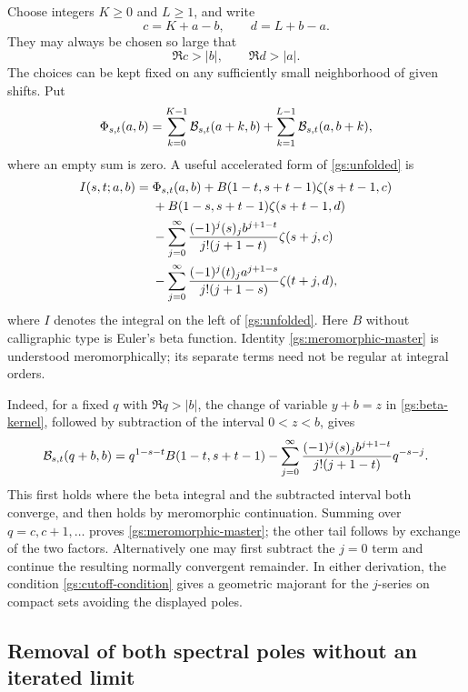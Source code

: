 \documentclass[11pt,letterpaper]{article}
\numberwithin{equation}{section}
\theoremstyle{definition}
\theoremstyle{remark}
\begin{document}
Choose integers $K\ge0$ and $L\ge1$, and write
\begin{equation}\label{gs:cd}
 c=K+a-b,\qquad d=L+b-a.
\end{equation}
They may always be chosen so large that
\begin{equation}\label{gs:cutoff-condition}
 \Re c>|b|,\qquad \Re d>|a|.
\end{equation}
The choices can be kept fixed on any sufficiently small neighborhood
of given shifts.  Put
\begin{equation}\label{gs:finite-prefix}
 \Phi_{s,t}(a,b)=
 \sum_{k=0}^{K-1}\mathcal B_{s,t}(a+k,b)
 +\sum_{k=1}^{L-1}\mathcal B_{s,t}(a,b+k),
\end{equation}
where an empty sum is zero.  A useful accelerated form of
\eqref{gs:unfolded} is
\begin{align}
 I(s,t;a,b)={}&\Phi_{s,t}(a,b)
 +B(1-t,s+t-1)\zeta(s+t-1,c)\notag\\
 &+B(1-s,s+t-1)\zeta(s+t-1,d)\notag\\
 &-\sum_{j=0}^\infty
 \frac{(-1)^j(s)_j b^{j+1-t}}{j!(j+1-t)}\zeta(s+j,c)\notag\\
 &-\sum_{j=0}^\infty
 \frac{(-1)^j(t)_j a^{j+1-s}}{j!(j+1-s)}\zeta(t+j,d),
 \label{gs:meromorphic-master}
\end{align}
where $I$ denotes the integral on the left of \eqref{gs:unfolded}.
Here $B$ without calligraphic type is Euler's beta function.
Identity \eqref{gs:meromorphic-master} is understood meromorphically;
its separate terms need not be regular at integral orders.

Indeed, for a fixed $q$ with $\Re q>|b|$, the change of variable
$y+b=z$ in \eqref{gs:beta-kernel}, followed by subtraction of the
interval $0<z<b$, gives
\begin{equation}\label{gs:strip-evaluation}
 \mathcal B_{s,t}(q+b,b)=q^{1-s-t}B(1-t,s+t-1)
 -\sum_{j=0}^\infty
 \frac{(-1)^j(s)_j b^{j+1-t}}{j!(j+1-t)}q^{-s-j}.
\end{equation}
This first holds where the beta integral and the subtracted interval
both converge, and then holds by meromorphic continuation.  Summing
over $q=c,c+1,\ldots$ proves \eqref{gs:meromorphic-master}; the other
tail follows by exchange of the two factors.  Alternatively one may
first subtract the $j=0$ term and continue the resulting normally
convergent remainder.  In either derivation, the condition
\eqref{gs:cutoff-condition} gives a geometric majorant for the
$j$-series on compact sets avoiding the displayed poles.

\subsection{Removal of both spectral poles without an iterated limit}
\end{document}
